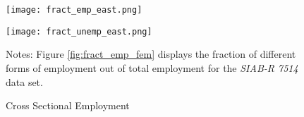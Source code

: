 \documentclass[12pt, a4paper]{article}
\begin{document}
\begin{figure}[!h]
\captionsetup{font=large}
\caption{Cross Sectional Employment}
	\begin{minipage}[b]{0.48\textwidth}
		\centering
		\texttt{[image: fract\_emp\_east.png]}
		\label{fig:fract_emp_east}
	\end{minipage}
	\begin{minipage}[b]{0.48\textwidth}
		\centering
		\texttt{[image: fract\_unemp\_east.png]}
		\label{fig:fract_unemp_east}
	\end{minipage}
\footnotesize{
\justifying Notes: Figure \ref{fig:fract_emp_fem} displays the fraction of different forms of employment out of total employment for the \emph{SIAB-R 7514} data set. \par} 
\end{figure}


\end{document}
